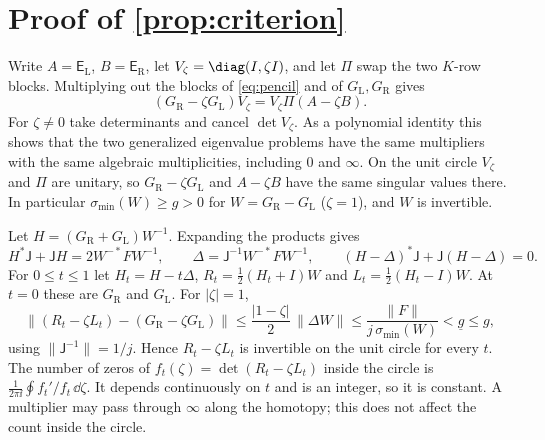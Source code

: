 \appendix

\section{Proof of \texorpdfstring{\cref{prop:criterion}}{the count criterion}}\label{app:criterion}
Write $A=\mathsf E_{\mathrm L}$, $B=\mathsf E_{\mathrm R}$, let $V_\zeta=\diag(I,\zeta I)$, and let
$\Pi$ swap the two $K$-row blocks. Multiplying out the blocks of
\eqref{eq:pencil} and of $G_{\mathrm L},G_{\mathrm R}$ gives
\begin{equation}\label{eq:app-swap}
  (G_{\mathrm R}-\zeta G_{\mathrm L})V_\zeta=V_\zeta\Pi(A-\zeta B).
\end{equation}
For $\zeta\ne0$ take determinants and cancel $\det V_\zeta$. As a polynomial
identity this shows that the two generalized eigenvalue problems have the
same multipliers with the
same algebraic multiplicities, including $0$ and $\infty$. On the unit circle
$V_\zeta$ and $\Pi$ are unitary, so $G_{\mathrm R}-\zeta G_{\mathrm L}$ and $A-\zeta B$
have the same singular values there. In particular $\sigma_{\min}(W)\ge g>0$ for $W=G_{\mathrm R}-G_{\mathrm L}$
($\zeta=1$), and $W$ is invertible.

Let $H=(G_{\mathrm R}+G_{\mathrm L})W^{-1}$. Expanding the products gives
\begin{equation}\label{eq:app-skew}
  H^*\mathsf J+\mathsf JH=2W^{-*}FW^{-1},\qquad
  \Delta=\mathsf J^{-1}W^{-*}FW^{-1},\qquad
  (H-\Delta)^*\mathsf J+\mathsf J(H-\Delta)=0 .
\end{equation}
For $0\le t\le1$ let $H_t=H-t\Delta$, $R_t=\frac12(H_t+I)W$ and
$L_t=\frac12(H_t-I)W$. At $t=0$ these are $G_{\mathrm R}$ and $G_{\mathrm L}$. For
$|\zeta|=1$,
\begin{equation}\label{eq:app-homotopy}
  \bigl\|(R_t-\zeta L_t)-(G_{\mathrm R}-\zeta G_{\mathrm L})\bigr\|
  \le\frac{|1-\zeta|}{2}\,\|\Delta W\|
  \le\frac{\|F\|}{j\,\sigma_{\min}(W)}<\underline g\le g,
\end{equation}
using $\|\mathsf J^{-1}\|=1/j$. Hence $R_t-\zeta L_t$ is invertible on the
unit circle for every $t$. The number of zeros of
$f_t(\zeta)=\det(R_t-\zeta L_t)$ inside the circle is
$\frac1{2\pi\ii}\oint f_t'/f_t\,\dd\zeta$. It depends continuously on $t$ and is
an integer, so it is constant. A multiplier may pass through $\infty$ along
the homotopy; this does not affect the count inside the circle.

